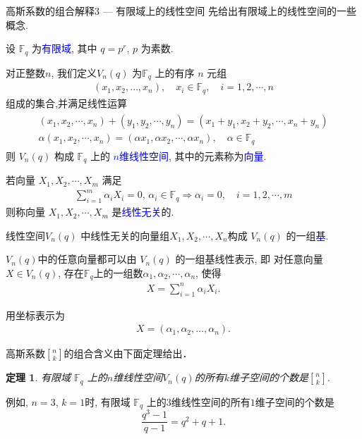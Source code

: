 \documentclass[punct]{ctexbeamer}
\newtheorem{thm}{定理}[section]
\newcommand{\blue}{\textcolor{blue}}
\begin{document}
\begin{frame}{高斯系数的组合解释3 --- 有限域上的线性空间}
先给出有限域上的线性空间的一些概念.

设 $\mathbb{F}_q$ 为\blue{有限域}, 其中 $q=p^{r}$, $p$ 为素数.

对正整数$n$, 我们定义$V_{n}(q)$ 为$\mathbb{F}_q$ 上的有序 $n$ 元组
\begin{align*}
    \left(x_{1}, x_{2}, \ldots, x_{n}\right), \quad x_{i} \in \mathbb{F}_q, \quad i=1,2, \cdots, n
\end{align*}
组成的集合,并满足线性运算
\begin{align*}
    \begin{array}{c}
        \left(x_{1}, x_{2}, \cdots, x_{n}\right)+\left(y_{1}, y_{2}, \cdots, y_{n}\right)=\left(x_{1}+y_{1}, x_{2}+y_{2}, \cdots, x_{n}+y_{n}\right) \\
        \alpha\left(x_{1}, x_{2}, \cdots, x_{n}\right)=\left(\alpha x_{1}, \alpha x_{2}, \cdots, \alpha x_{n}\right), \quad \alpha \in \mathbb{F}_q
    \end{array}
\end{align*}
则 $V_n(q)$ 构成 $\mathbb{F}_q$ 上的 \blue{$n$维线性空间}, 其中的元素称为\blue{向量}.

若向量 $X_{1}, X_{2}, \cdots, X_{m}$ 满足
\begin{align*}
    \sum_{i=1}^{m} \alpha_{i} X_{i}=0, \, \alpha_{i} \in \mathbb{F}_q \Rightarrow \alpha_{i}=0, \quad i=1,2, \cdots, m
\end{align*}
则称向量 $X_{1}, X_{2}, \cdots, X_{m}$ 是\blue{线性无关}的.

\end{frame}


\begin{frame}
线性空间$V_n(q)$ 中线性无关的向量组$X_{1}, X_{2}, \cdots, X_{n}$构成 $V_n(q)$ 的一组\blue{基}.


$V_n(q)$中的任意向量都可以由 $V_n(q)$ 的一组基线性表示,
 即 对任意向量$ X \in V_n(q)$, 存在$\mathbb{F}_q$上的一组数$\alpha_{1}, \alpha_{2}, \cdots, \alpha_{n}$, 使得
\begin{align*}
    X=\sum_{i=1}^{n} \alpha_{i} X_{i}.
\end{align*}


用坐标表示为
\begin{align*}
    X=\left(\alpha_{1}, \alpha_{2}, \ldots, \alpha_{n}\right) .
\end{align*}

高斯系数${n\brack
    k}$的组合含义由下面定理给出．


\begin{thm}
    有限域 $\mathbb{F}_q$ 上的$n$维线性空间$V_n(q)$的所有$k$维子空间的个数是${n\brack k}$.
\end{thm}

例如,
 $n=3$, $k=1$时,  有限域 $\mathbb{F}_q$ 上的$3$维线性空间的所有$1$维子空间的个数是$$\frac{q^3-1}{q-1} = q^2+q+1.$$

\end{frame}
\end{document}
